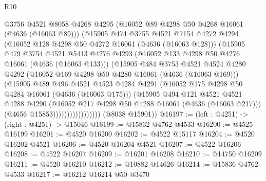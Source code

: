 \begin{lexlean}{R10}
\begin{coremodule}
                            @3756
                            @4521
                            @8058
                            @4268
                            @4295
                            (@16052 @89 @4298 @50 @4268 @16061 (@4636 (@16063 @89)))
                            (@15905
                              @474
                              @3755
                              @4521
                              @7154
                              @4272
                              @4294
                              (@16052 @128 @4298 @50 @4272 @16061 (@4636 (@16063 @128)))
                              (@15905
                                @479
                                @3754
                                @4521
                                @5413
                                @4276
                                @4293
                                (@16052 @133 @4298 @50 @4276 @16061 (@4636 (@16063 @133)))
                                (@15905
                                  @484
                                  @3753
                                  @4521
                                  @4524
                                  @4280
                                  @4292
                                  (@16052 @169 @4298 @50 @4280 @16061 (@4636 (@16063 @169)))
                                  (@15905
                                    @489
                                    @496
                                    @4521
                                    @4523
                                    @4284
                                    @4291
                                    (@16052 @175 @4298 @50 @4284 @16061 (@4636 (@16063 @175)))
                                    (@15905
                                      @494
                                      @121
                                      @4521
                                      @4521
                                      @4288
                                      @4290
                                      (@16052 @217 @4298 @50 @4288 @16061 (@4636 (@16063 @217)))
                                      (@4656 @15853)))))))))))))))))
      (@8038 @15901))
@16197 := (left : @4251) -> (right : @4251) -> @15046
@16199 := @15832 @4762 @4533
@16200 := @4525 @16199
@16201 := @4520 @16200
@16202 := @4522 @15117
@16204 := @4520 @16202 @4521
@16206 := @4520 @16204 @4521
@16207 := @4522 @16206
@16208 := @4522 @16207
@16209 := @16201 @16208
@16210 := @14750 @16209
@16211 := @4520 @16210
@16212 := @10882 @14626
@16214 := @15836 @4762 @4533
@16217 := @16212 @16214 @50 @3470

\end{coremodule}
\end{lexlean}
